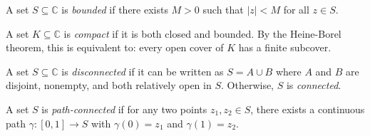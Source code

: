 \begin{center}
\end{center}

\begin{definition}
  A set $S \subseteq \mathbb{C}$ is \emph{bounded} if there exists $M > 0$ such that $|z| < M$ for all $z \in S$.
\end{definition}

\begin{definition}
  A set $K \subseteq \mathbb{C}$ is \emph{compact} if it is both closed and bounded.
  By the Heine-Borel theorem, this is equivalent to: every open cover of $K$ has a finite subcover.
\end{definition}

\begin{definition}
  A set $S \subseteq \mathbb{C}$ is \emph{disconnected} if it can be written as $S = A \cup B$ where $A$ and $B$ are disjoint, nonempty, and both relatively open in $S$. Otherwise, $S$ is \emph{connected}.

  A set $S$ is \emph{path-connected} if for any two points $z_1, z_2 \in S$, there exists a continuous path $\gamma : [0,1] \to S$ with $\gamma(0) = z_1$ and $\gamma(1) = z_2$.
\end{definition}


